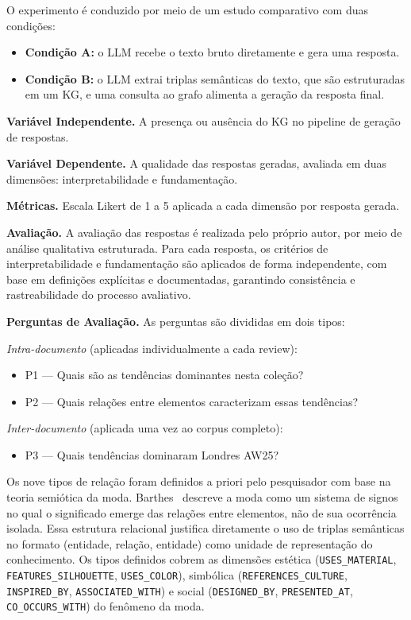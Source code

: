 \documentclass[sigconf]{acmart}
\begin{document}
O experimento é conduzido por meio de um estudo comparativo com duas condições:

\begin{itemize}
  \item \textbf{Condição A:} o LLM recebe o texto bruto diretamente e gera uma resposta.
  \item \textbf{Condição B:} o LLM extrai triplas semânticas do texto, que são estruturadas em um KG, e uma consulta ao grafo alimenta a geração da resposta final.
\end{itemize}

\noindent\textbf{Variável Independente.} A presença ou ausência do KG no pipeline de geração de respostas.

\noindent\textbf{Variável Dependente.} A qualidade das respostas geradas, avaliada em duas dimensões: interpretabilidade e fundamentação.

\noindent\textbf{Métricas.} Escala Likert de 1 a 5 aplicada a cada dimensão por resposta gerada.

\noindent\textbf{Avaliação.} A avaliação das respostas é realizada pelo próprio autor, por meio de análise qualitativa estruturada. Para cada resposta, os critérios de interpretabilidade e fundamentação são aplicados de forma independente, com base em definições explícitas e documentadas, garantindo consistência e rastreabilidade do processo avaliativo.

\noindent\textbf{Perguntas de Avaliação.} As perguntas são divididas em dois tipos:

\textit{Intra-documento} (aplicadas individualmente a cada review):
\begin{itemize}
  \item P1 --- Quais são as tendências dominantes nesta coleção?
  \item P2 --- Quais relações entre elementos caracterizam essas tendências?
\end{itemize}

\textit{Inter-documento} (aplicada uma vez ao corpus completo):
\begin{itemize}
  \item P3 --- Quais tendências dominaram Londres AW25?
\end{itemize}

Os nove tipos de relação foram definidos a priori pelo pesquisador com base na teoria semiótica da moda. Barthes~\cite{barthes1967} descreve a moda como um sistema de signos no qual o significado emerge das relações entre elementos, não de sua ocorrência isolada. Essa estrutura relacional justifica diretamente o uso de triplas semânticas no formato (entidade, relação, entidade) como unidade de representação do conhecimento. Os tipos definidos cobrem as dimensões estética (\texttt{USES\_MATERIAL}, \texttt{FEATURES\_SILHOUETTE}, \texttt{USES\_COLOR}), simbólica (\texttt{REFERENCES\_CULTURE}, \texttt{INSPIRED\_BY}, \texttt{ASSOCIATED\_WITH}) e social (\texttt{DESIGNED\_BY}, \texttt{PRESENTED\_AT}, \texttt{CO\_OCCURS\_WITH}) do fenômeno da moda.
\end{document}
